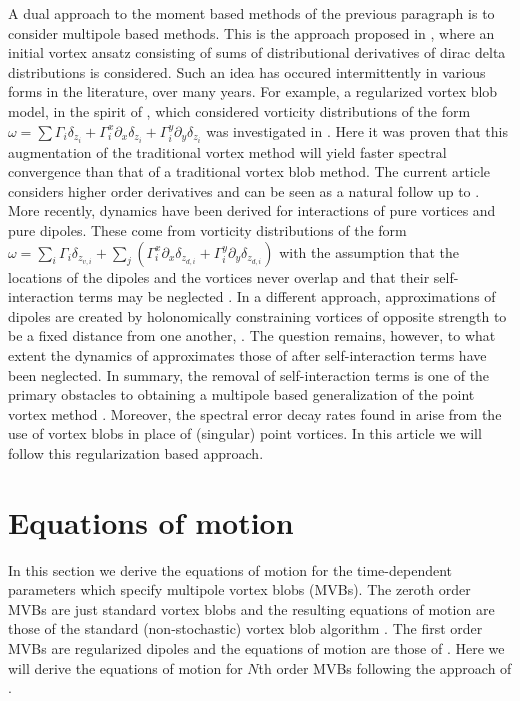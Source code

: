 \documentclass[12pt]{amsart}
\theoremstyle{remark}
\begin{document}
A dual approach to the moment based methods of the previous paragraph \cite{Rossi1997,Rossi2005,NagemSandriUminskyWayne2009} is to consider multipole based methods.
This is the approach proposed in \cite{Nicolaides1986}, where an initial vortex ansatz consisting of sums of distributional derivatives of dirac delta distributions is considered.
Such an idea has occured intermittently in various forms in the literature, over many years.
For example, a regularized vortex blob model, in the spirit of \cite{BealeMajda1982,BealeMajda1985}, which considered vorticity distributions of the form $\omega = \sum \Gamma_i \delta_{z_i} + \Gamma_i^x \partial_x \delta_{z_i} + \Gamma_i^y \partial_y \delta_{z_i}$ was investigated in \cite{ChiuNivolaides1988}.
Here it was proven that this augmentation of the traditional vortex method will yield faster spectral convergence than that of a traditional vortex blob method.
The current article considers higher order derivatives and can be seen as a natural follow up to \cite{ChiuNivolaides1988}.
More recently, dynamics have been derived for interactions of pure vortices and pure dipoles.
These come from vorticity distributions of the form $\omega = \sum_{i} \Gamma_i \delta_{z_{v,i}} +  \sum_{j} \left(\Gamma_i^x \partial_x \delta_{z_{d,i}} + \Gamma_i^y \partial_y \delta_{z_{d,i}}\right)$
with the assumption that the locations of the dipoles and the vortices never overlap and that their self-interaction terms may be neglected \cite{Yanovsky2009,TurYanovskyKonstantin2011}.
In a different approach, approximations of dipoles are created by holonomically constraining vortices of opposite strength to be a fixed distance from one another, \cite{TchieuKansoNewton2012}. The question remains, however, to what extent the dynamics of \cite{TchieuKansoNewton2012} approximates those of \cite{Yanovsky2009,TurYanovskyKonstantin2011} after self-interaction terms have been neglected.
In summary, the removal of self-interaction terms is one of the primary obstacles to obtaining a multipole based generalization of the point vortex method \cite{Smith2011}.
Moreover, the spectral error decay rates found in \cite{Hald1979,BealeMajda1982,BealeMajda1985,ChiuNivolaides1988} arise from the use of vortex blobs in place of (singular) point vortices.
In this article we will follow this regularization based approach.%

\section{Equations of motion}
\label{sec:EOM}
In this section we derive the equations of motion for the time-dependent parameters which specify multipole vortex blobs (MVBs).
The zeroth order MVBs are just standard vortex blobs and the resulting equations of motion are those of the standard (non-stochastic) vortex blob algorithm \cite{Chorin1973}.
The first order MVBs are regularized dipoles and the equations of motion are those of \cite{ChiuNivolaides1988}.
Here we will derive the equations of motion for $N$th order MVBs following the approach of \cite{ChiuNivolaides1988}.
\end{document}
